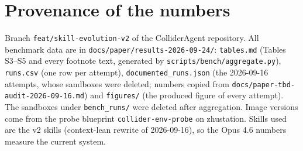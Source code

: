 \documentclass[11pt]{article}
\begin{document}
\section{Provenance of the numbers}
Branch \texttt{feat/skill-evolution-v2} of the ColliderAgent repository. All benchmark data are in
\texttt{docs/paper/results-2026-09-24/}: \texttt{tables.md} (Tables S3--S5 and every footnote text, generated by
\texttt{scripts/bench/aggregate.py}), \texttt{runs.csv} (one row per attempt), \texttt{documented\_runs.json} (the
2026-09-16 attempts, whose sandboxes were deleted; numbers copied from \texttt{docs/paper-tbd-audit-2026-09-16.md}) and
\texttt{figures/} (the produced figure of every attempt). The sandboxes under \texttt{bench\_runs/} were deleted after
aggregation. Image versions come from the probe blueprint \texttt{collider-env-probe} on zhustation. Skills used are the v2
skills (context-lean rewrite of 2026-09-16), so the Opus 4.6 numbers measure the current system.
\end{document}
